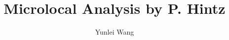 \documentclass[12pt,reqno]{amsart}
\theoremstyle{definition}
\numberwithin{equation}{section}
\begin{document}
\title[Microlocal Analysis by P. Hintz]{Microlocal Analysis by P. Hintz}
\author[Y. Wang]{Yunlei Wang}


\maketitle


\end{document}
